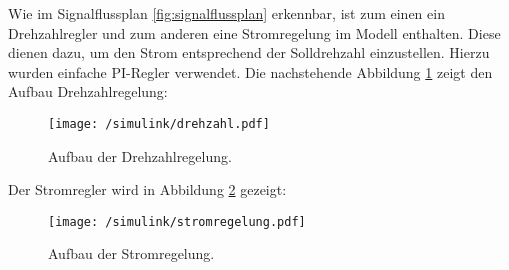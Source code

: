 Wie im Signalflussplan \ref{fig:signalflussplan} erkennbar, ist zum einen ein Drehzahlregler und zum anderen eine Stromregelung im Modell enthalten. 
Diese dienen dazu, um den Strom entsprechend der Solldrehzahl einzustellen.
Hierzu wurden einfache PI-Regler verwendet.
Die nachstehende Abbildung \ref{fig:drehzahl} zeigt den Aufbau Drehzahlregelung:

\begin{figure}[h]
	\centering
	\texttt{[image: /simulink/drehzahl.pdf]}
	\label{fig:drehzahl}
	\caption{Aufbau der Drehzahlregelung.}
\end{figure}

Der Stromregler wird in Abbildung \ref{fig:stromregelung} gezeigt:

\begin{figure}[h]
	\centering
	\texttt{[image: /simulink/stromregelung.pdf]}
	\label{fig:stromregelung}
	\caption{Aufbau der Stromregelung.}
\end{figure}

